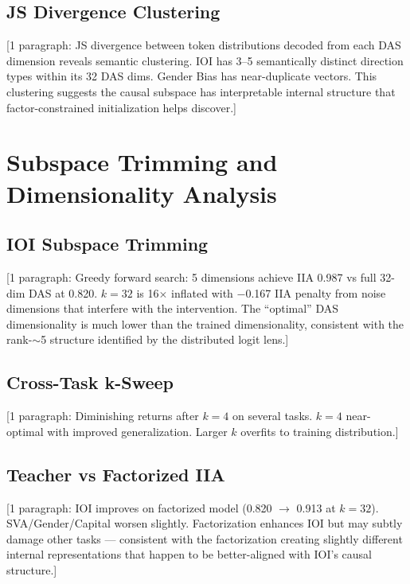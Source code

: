 \documentclass[11pt]{article}
\begin{document}
\subsection{JS Divergence Clustering}

[1 paragraph: JS divergence between token distributions decoded from
each DAS dimension reveals semantic clustering. IOI has 3--5
semantically distinct direction types within its 32 DAS dims. Gender
Bias has near-duplicate vectors. This clustering suggests the causal
subspace has interpretable internal structure that factor-constrained
initialization helps discover.]



\section{Subspace Trimming and Dimensionality Analysis}
\label{app:trimming}


\subsection{IOI Subspace Trimming}

[1 paragraph: Greedy forward search: 5 dimensions achieve IIA 0.987 vs
full 32-dim DAS at 0.820. $k=32$ is 16$\times$ inflated with $-$0.167
IIA penalty from noise dimensions that interfere with the intervention.
The ``optimal'' DAS dimensionality is much lower than the trained
dimensionality, consistent with the rank-$\sim$5 structure identified
by the distributed logit lens.]

\subsection{Cross-Task k-Sweep}

[1 paragraph: Diminishing returns after $k=4$ on several tasks. $k=4$
near-optimal with improved generalization. Larger $k$ overfits to
training distribution.]

\subsection{Teacher vs Factorized IIA}

[1 paragraph: IOI improves on factorized model (0.820 $\to$ 0.913 at
$k=32$). SVA/Gender/Capital worsen slightly. Factorization enhances IOI
but may subtly damage other tasks --- consistent with the factorization
creating slightly different internal representations that happen to be
better-aligned with IOI's causal structure.]
\end{document}
